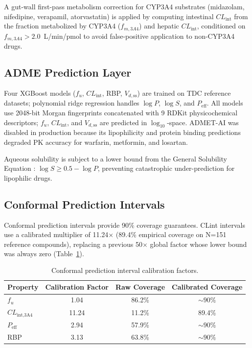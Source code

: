 \documentclass[review,3p]{elsarticle}
\begin{document}
A gut-wall first-pass metabolism correction for CYP3A4 substrates (midazolam, nifedipine, verapamil, atorvastatin) is applied by computing intestinal $CL_{\text{int}}$ from the fraction metabolized by CYP3A4 ($f_{m,3A4}$) and hepatic $CL_{\text{int}}$, conditioned on $f_{m,3A4} > 2.0$~\textmu L/min/pmol to avoid false-positive application to non-CYP3A4 drugs.

\subsection{ADME Prediction Layer}
\label{sec:adme}

Four XGBoost models ($f_u$, $CL_{\text{int}}$, RBP, $V_{d,\text{ss}}$) are trained on TDC reference datasets; polynomial ridge regression handles $\log P$, $\log S$, and $P_{\text{eff}}$. All models use 2048-bit Morgan fingerprints concatenated with 9 RDKit physicochemical descriptors; $f_u$, $CL_{\text{int}}$, and $V_{d,\text{ss}}$ are predicted in $\log_{10}$-space. ADMET-AI was disabled in production because its lipophilicity and protein binding predictions degraded PK accuracy for warfarin, metformin, and losartan.

Aqueous solubility is subject to a lower bound from the General Solubility Equation \cite{yalkowsky1980solubility}: $\log S \geq 0.5 - \log P$, preventing catastrophic under-prediction for lipophilic drugs.

\subsection{Conformal Prediction Intervals}
\label{sec:conformal}

Conformal prediction intervals provide 90\% coverage guarantees. CLint intervals use a calibrated multiplier of 11.24$\times$ (89.4\% empirical coverage on N=151 reference compounds), replacing a previous 50$\times$ global factor whose lower bound was always zero (Table~\ref{tab:conformal_calib}).

\begin{table}[H]
\centering
\caption{Conformal prediction interval calibration factors.}
\label{tab:conformal_calib}
\begin{tabular}{lccc}
\toprule
Property & Calibration Factor & Raw Coverage & Calibrated Coverage \\
\midrule
$f_u$ & 1.04 & 86.2\% & ${\sim}90\%$ \\
$CL_{\text{int,3A4}}$ & 11.24 & 11.2\% & 89.4\% \\
$P_{\text{eff}}$ & 2.94 & 57.9\% & ${\sim}90\%$ \\
RBP & 3.13 & 63.8\% & ${\sim}90\%$ \\
\bottomrule
\end{tabular}
\end{table}
\end{document}
